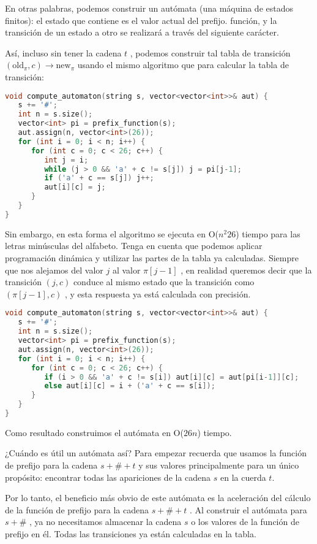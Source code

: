 \begin{itemize}
	En otras palabras, podemos construir un autómata (una máquina de estados finitos): el estado que contiene es el valor actual del prefijo. función, y la transición de un estado a otro se realizará a través del siguiente carácter.
	
	Así, incluso sin tener la cadena $t$ , podemos construir tal tabla de transición $(\text{old}_\pi, c) \rightarrow \text{new}_\pi$  usando el mismo algoritmo que para calcular la tabla
	de transición:
	
\begin{lstlisting}[language=C++]	
void compute_automaton(string s, vector<vector<int>>& aut) {
   s += '#';
   int n = s.size();
   vector<int> pi = prefix_function(s);
   aut.assign(n, vector<int>(26));
   for (int i = 0; i < n; i++) {
      for (int c = 0; c < 26; c++) {
         int j = i;
         while (j > 0 && 'a' + c != s[j]) j = pi[j-1];
         if ('a' + c == s[j]) j++;
         aut[i][c] = j;
      }
   }
}
\end{lstlisting}

Sin embargo, en esta forma el algoritmo se ejecuta en O($n^2 26$) tiempo para las letras minúsculas del alfabeto. Tenga en cuenta que podemos aplicar programación dinámica y utilizar las partes de la tabla ya calculadas. Siempre que nos alejamos del valor $j$ al valor $\pi[j-1]$ , en realidad queremos
decir que la transición $(j, c)$ conduce al mismo estado que la transición como $(\pi[j-1],c)$ , y esta respuesta ya está calculada con precisión.

\begin{lstlisting}[language=C++]	
void compute_automaton(string s, vector<vector<int>>& aut) {
   s += '#';
   int n = s.size();
   vector<int> pi = prefix_function(s);
   aut.assign(n, vector<int>(26));
   for (int i = 0; i < n; i++) {
      for (int c = 0; c < 26; c++) {
         if (i > 0 && 'a' + c != s[i]) aut[i][c] = aut[pi[i-1]][c];
         else aut[i][c] = i + ('a' + c == s[i]);
      }
   }
}
\end{lstlisting}

Como resultado construimos el autómata en O($26n$) tiempo.

¿Cuándo es útil un autómata así? Para empezar recuerda que usamos la función de prefijo para la cadena $s + \# + t$ y sus valores principalmente para un único propósito: encontrar todas las apariciones de la cadena $s$ en la cuerda $t$.

Por lo tanto, el beneficio más obvio de este autómata es la aceleración del cálculo de la función de prefijo para la cadena $s + \# + t$ . Al construir el autómata para $s + \#$ , ya no necesitamos almacenar la cadena $s$ o los valores de la función de prefijo en él. Todas las transiciones ya están
calculadas en la tabla.


\end{itemize}
